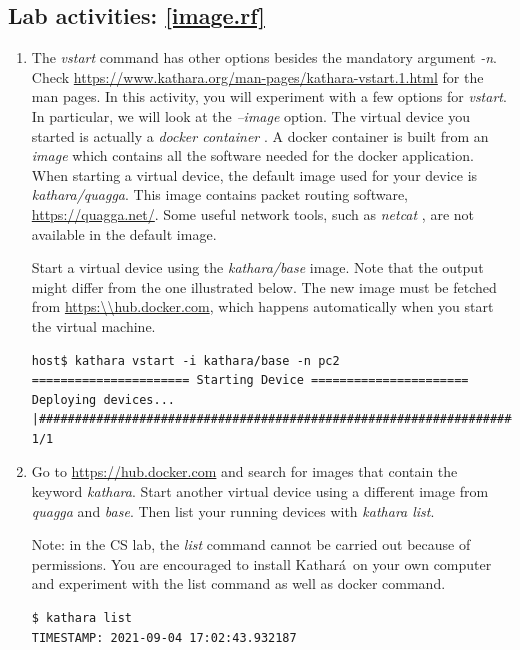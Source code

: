 \documentclass[12pt]{book}
\newcommand{\kathara}{Kathar\'a}
\begin{document}
\begin{enumerate}[label=\arabic*.]
\section{Lab activities: \ref{image.rf}}

\begin{enumerate}[resume*]
\item The \emph{vstart} command has other options besides the mandatory argument \emph{-n}. Check \url{https://www.kathara.org/man-pages/kathara-vstart.1.html} for the man pages. In this activity, you will experiment with a few options for \emph{vstart}. In particular, we will look at the \emph{--image} option. The virtual device you started is actually a \emph{docker container} \cite{docker-useful}. A docker container is built from an \emph{image} which contains all the software needed for the docker application. When starting a virtual device, the default image used for your device is \emph{kathara/quagga}. This image contains packet routing software, \url{https://quagga.net/}. Some useful network tools, such as \emph{netcat} \cite{netcat}, are not available in the default image.

  Start a virtual device using the \emph{kathara/base} image. Note that the output might differ from the one illustrated below. The new image must be fetched from \url{https:\\hub.docker.com}, which happens automatically when you start the virtual machine.

\begin{lstlisting}
host$ kathara vstart -i kathara/base -n pc2
====================== Starting Device ======================
Deploying devices... |#######################################################################################| 1/1
\end{lstlisting}

\item Go to \url{https://hub.docker.com} and search for images that contain the keyword \emph{kathara}. Start another virtual device using a different image from \emph{quagga} and \emph{base}. Then list your running devices with \emph{kathara list}.

  Note: in the CS lab, the \emph{list} command cannot be carried out because of permissions. You are encouraged to install \kathara\ on your own computer and experiment with the list command as well as docker command.

\begin{lstlisting}
$ kathara list
TIMESTAMP: 2021-09-04 17:02:43.932187



\end{lstlisting}
\end{enumerate}
\end{enumerate}
\end{document}
